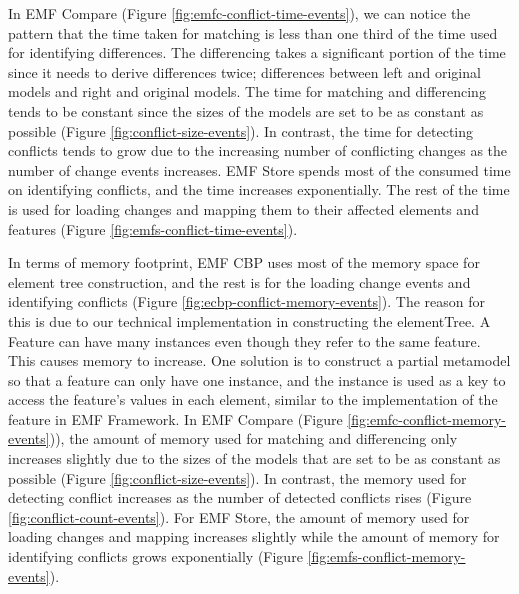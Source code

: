 In EMF Compare (Figure \ref{fig:emfc-conflict-time-events}), we can notice the pattern that the time taken for matching is less than one third of the time used for identifying differences. The differencing takes a significant portion of the time since it needs to derive differences twice; differences between left and original models and right and original models. The time for matching and differencing tends to be constant since the sizes of the models are set to be as constant as possible (Figure \ref{fig:conflict-size-events}). In contrast, the time for detecting conflicts tends to grow due to the increasing number of conflicting changes as the number of change events increases. EMF Store spends most of the consumed time on identifying conflicts, and the time increases exponentially. The rest of the time is used for loading changes and mapping them to their affected elements and features (Figure \ref{fig:emfs-conflict-time-events}). 

In terms of memory footprint, EMF CBP uses most of the memory space for element tree construction, and the rest is for the loading change events and identifying conflicts (Figure \ref{fig:ecbp-conflict-memory-events}). The reason for this is due to our technical implementation in constructing the \textsf{elementTree}. A Feature can have many instances even though they refer to the same feature. This causes memory to increase. One solution is to construct a partial metamodel so that a feature can only have one instance, and the instance is used as a key to access the feature's values in each element, similar to the implementation of the feature in EMF Framework. In EMF Compare (Figure \ref{fig:emfc-conflict-memory-events})), the amount of memory used for matching and differencing only increases slightly due to the sizes of the models that are set to be as constant as possible (Figure \ref{fig:conflict-size-events}). In contrast, the memory used for detecting conflict increases as the number of detected conflicts rises (Figure \ref{fig:conflict-count-events}). For EMF Store, the amount of memory used for loading changes and mapping increases slightly while the amount of memory for identifying conflicts grows exponentially (Figure \ref{fig:emfs-conflict-memory-events}).

